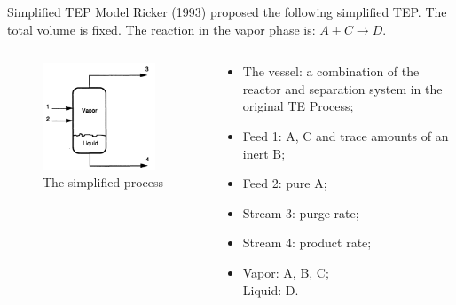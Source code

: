 \documentclass[10pt]{beamer}
\begin{document}
  \begin{frame}{Simplified TEP Model}
    Ricker (1993) proposed the following simplified TEP. The total volume is fixed. The reaction in the vapor phase is: $A+C\rightarrow D$.
    \begin{columns}
      \begin{column}{0.45\textwidth}
        \begin{figure}
          \includegraphics[width=0.9\textwidth]{simplifiedmodel.png}
          \caption{The simplified process}
        \end{figure}
      \end{column}
      \begin{column}{0.55\textwidth} 		
        \begin{itemize}
        \item The vessel: a combination of the reactor and separation system in the original TE Process;
        \item Feed 1: A, C and trace amounts of an inert B;
        \item Feed 2: pure A;
        \item Stream 3: purge rate;
        \item Stream 4: product rate;
        \item Vapor: A, B, C;\\
          Liquid: D.
        \end{itemize}
      \end{column}
    \end{columns}
  \end{frame}
\end{document}

